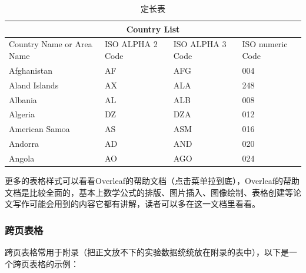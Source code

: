 \begin{table}[!htb]
\centering
\caption{定长表}
\label{tab:5}
\begin{tabular}{ |p{3cm}||p{3cm}|p{3cm}|p{3cm}| }
 \hline
 \multicolumn{4}{|c|}{Country List} \\
 \hline
Country Name or Area Name& ISO ALPHA 2 Code & ISO ALPHA 3 Code & ISO numeric Code \\
 \hline
 Afghanistan   & AF    &AFG&   004\\
 Aland Islands&   AX  & ALA   &248\\
 Albania &AL & ALB&  008\\
 Algeria    &DZ & DZA&  012\\
 American Samoa&   AS  & ASM&016\\
 Andorra& AD  & AND   &020\\
 Angola& AO  & AGO&024\\
 \hline
\end{tabular}
\end{table}

更多的表格样式可以看看Overleaf的帮助文档（点击菜单拉到底），Overleaf的帮助文档是比较全面的，基本上数学公式的排版、图片插入、图像绘制、表格创建等论文写作可能会用到的内容它都有讲解，读者可以多在这一文档里看看。

\subsubsection{跨页表格}

跨页表格常用于附录（把正文放不下的实验数据统统放在附录的表中），以下是一个跨页表格的示例：

